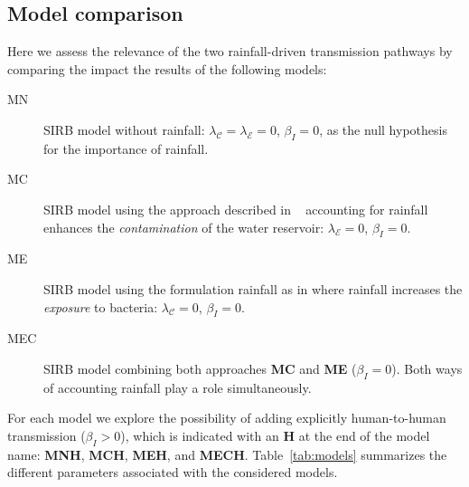 \subsection{Model comparison}
Here we assess the relevance of the two rainfall-driven transmission pathways by comparing the impact the results of the following models:
\begin{description}
    \item[MN] SIRB model without rainfall: $\lambda_{\mathcal{C}} = \lambda_{\mathcal{E}} = 0$, $\beta_{I} = 0$, as the null hypothesis for the importance of rainfall.
  \item[MC] SIRB model using the approach described in ~\cite{Rinaldo:Reassessment20102011:2012,bertuzzoProbabilityExtinctionHaiti2016} accounting for rainfall enhances the \textit{contamination} of the water reservoir: $\lambda_{\mathcal{E}} = 0$, $\beta_{I} = 0$. 
  \item[ME] SIRB model using the formulation rainfall as in  \cite{eisenbergExaminingRainfallCholera2013} where rainfall increases the \textit{exposure} to bacteria: $\lambda_{\mathcal{C}} = 0$, $\beta_{I} = 0$. 
  \item[MEC] SIRB model combining both approaches \textbf{MC} and \textbf{ME} ($\beta_{I} = 0$). Both ways of accounting rainfall play a role simultaneously.
\end{description}

 For each model we explore the possibility of adding explicitly human-to-human transmission ($\beta_{I} > 0$), which is indicated with an \textbf{H} at the end of the model name: \textbf{MNH}, \textbf{MCH}, \textbf{MEH}, and \textbf{MECH}. Table~\ref{tab:models} summarizes the different parameters associated with the considered models.


